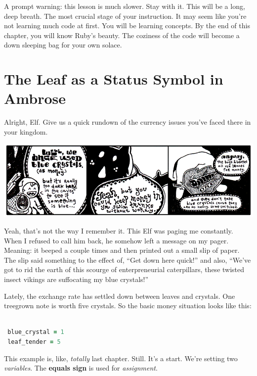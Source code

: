 \documentclass[10pt,twoside]{report}
\begin{document}
A prompt warning: this lesson is much slower.  Stay with it.  This
will be a long, deep breath. The most crucial stage of your
instruction.  It may seem like you're not learning much code at first.
You will be learning concepts.  By the end of this chapter, you will
know Ruby's beauty.  The coziness of the code will become a down
sleeping bag for your own solace.


\section{The Leaf as a Status Symbol in Ambrose}


Alright, Elf.  Give us a quick rundown of the currency issues you've
faced there in your kingdom.

	\includegraphics[width=1.0\textwidth]{cache/22.png}

Yeah, that's not the way I remember it.  This Elf was paging me
constantly.  When I refused to call him back, he somehow left a
message on my pager.  Meaning: it beeped a couple times and then
printed out a small slip of paper.  The slip said something to the
effect of, ``Get down here quick!'' and also, ``We've got to rid the
earth of this scourge of enterpreneurial caterpillars, these twisted
insect vikings are suffocating my blue crystals!''

Lately, the exchange rate has settled down between leaves and
crystals.  One treegrown note is worth five crystals.  So the basic
money situation looks like this:


\begin{lstlisting}[basicstyle=\ttfamily\color{basiccolor},
    commentstyle = \ttfamily\color{commentcolor},
    keywordstyle=\ttfamily\color{keywordscolor},
    stringstyle=\color{stringcolor},
    language=Ruby,
    basicstyle=\small\ttfamily,
    showstringspaces=false,
  ]

 blue_crystal = 1 
 leaf_tender = 5

\end{lstlisting}


This example is, like, {\em totally} last chapter.  Still.  It's a
start.  We're setting two {\em variables}. The {\bf equals sign} is
used for {\em assignment}.
\end{document}
